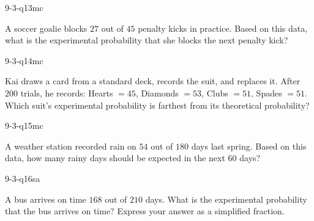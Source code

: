\begin{practiceQuestion}{9-3-q13}{mc}
\begin{questionText}
A soccer goalie blocks $27$ out of $45$ penalty kicks in practice. Based on this data, what is the experimental probability that she blocks the next penalty kick?
\end{questionText}
\end{practiceQuestion}

\begin{practiceQuestion}{9-3-q14}{mc}
\begin{questionText}
Kai draws a card from a standard deck, records the suit, and replaces it. After $200$ trials, he records: Hearts $= 45$, Diamonds $= 53$, Clubs $= 51$, Spades $= 51$. Which suit's experimental probability is farthest from its theoretical probability?
\end{questionText}
\end{practiceQuestion}

\begin{practiceQuestion}{9-3-q15}{mc}
\begin{questionText}
A weather station recorded rain on $54$ out of $180$ days last spring. Based on this data, how many rainy days should be expected in the next $60$ days?
\end{questionText}
\end{practiceQuestion}


\begin{practiceQuestion}{9-3-q16}{sa}
\begin{questionText}
A bus arrives on time $168$ out of $210$ days. What is the experimental probability that the bus arrives on time? Express your answer as a simplified fraction.
\end{questionText}
\end{practiceQuestion}

